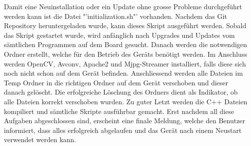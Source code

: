 Damit eine Neuinstallation oder ein Update ohne grosse Probleme durchgeführt werden kann ist die Datei "'initialization.sh"' vorhanden. Nachdem das Git Repository heruntergeladen wurde, kann dieses Skript ausgeführt werden. Sobald das Skript gestartet wurde, wird anfänglich nach Upgrades und Updates vom sämtlichen Programmen auf dem Board gesucht. Danach werden die notwendigen Ordner erstellt, welche für den Betrieb des Geräts benötigt werden. Im Anschluss werden OpenCV, Avconv, Apache2 und Mjpg-Streamer installiert, falls diese sich noch nicht schon auf dem Gerät befinden. Anschliessend werden alle Dateien im Temp Ordner in die richtigen Ordner auf dem Gerät verschoben und dieser danach gelöscht. Die erfolgreiche Löschung des Ordners dient als Indikator, ob alle Dateien korrekt verschoben wurden. Zu guter Letzt werden die C++ Dateien kompiliert und sämtliche Skripte ausführbar gemacht. Erst nachdem all diese Aufgaben abgeschlossen sind, erscheint eine finale Meldung, welche den Benutzer informiert, dass alles erfolgreich abgelaufen und das Gerät nach einem Neustart verwendet werden kann.